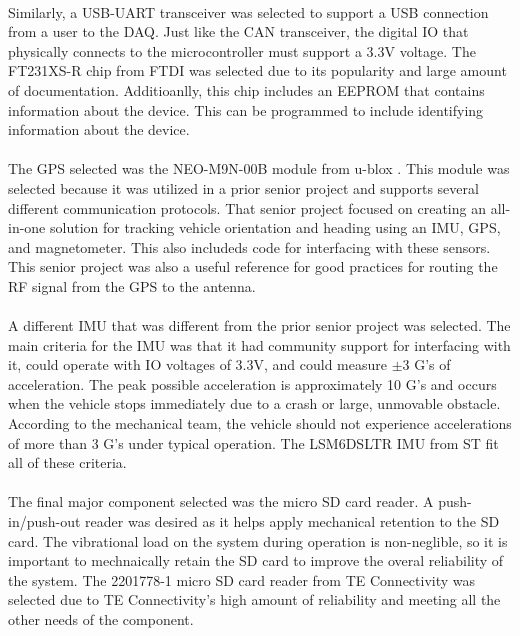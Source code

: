 \paragraph{}
Similarly, a USB-UART transceiver was selected to support a USB connection from a user to the DAQ.
Just like the CAN transceiver, the digital IO that physically connects to the microcontroller must support a 3.3V voltage.
The FT231XS-R chip from FTDI \cite{USBProductPage} was selected due to its popularity and large amount of documentation.
Additioanlly, this chip includes an EEPROM that contains information about the device.
This can be programmed to include identifying information about the device.

\paragraph{}
The GPS selected was the NEO-M9N-00B module from u-blox \cite{GPSProductPage}.
This module was selected because it was utilized in a prior senior project and supports several different communication protocols.
That senior project focused on creating an all-in-one solution for tracking vehicle orientation and heading using an IMU, GPS, and magnetometer.
This also includeds code for interfacing with these sensors.
This senior project was also a useful reference for good practices for routing the RF signal from the GPS to the antenna.

\paragraph{}
A different IMU that was different from the prior senior project was selected.
The main criteria for the IMU was that it had community support for interfacing with it, could operate with IO voltages of 3.3V, and could measure $\pm$3 G's of acceleration.
The peak possible acceleration is approximately 10 G's and occurs when the vehicle stops immediately due to a crash or large, unmovable obstacle.
According to the mechanical team, the vehicle should not experience accelerations of more than 3 G's under typical operation.
The LSM6DSLTR IMU from ST \cite{IMUProductPage} fit all of these criteria.

\paragraph{}
The final major component selected was the micro SD card reader.
A push-in/push-out reader was desired as it helps apply mechanical retention to the SD card.
The vibrational load on the system during operation is non-neglible, so it is important to mechnaically retain the SD card to improve the overal reliability of the system.
The 2201778-1 micro SD card reader from TE Connectivity \cite{SDReaderProductPage} was selected due to TE Connectivity's high amount of reliability and meeting all the other needs of the component.

